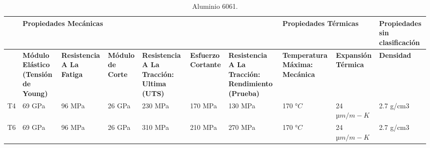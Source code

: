 \begin{landscape}
	\begin{table}[H]
		\centering
		\small
		\caption{Aluminio 6061.}
			\begin{tabular}{|p{1.5em}|p{5.355em}|p{5.355em}|p{5.355em}|p{5.355em}|p{4.645em}|p{7em}|p{6.285em}|p{5.8em}|p{5.93em}|}
			\hline
			\multicolumn{1}{|r|}{} & \multicolumn{6}{p{39.995em}|}{\cellcolor[rgb]{ .851,  .882,  .949}\textbf{Propiedades Mecánicas}} & \multicolumn{2}{p{13.64em}|}{\cellcolor[rgb]{ .988,  .894,  .839}\textbf{Propiedades Térmicas}} & \cellcolor[rgb]{ 1,  .949,  .8}\textbf{Propiedades sin clasificación} \\
			\hline
			\multicolumn{1}{|r|}{} & \cellcolor[rgb]{ .851,  .882,  .949}\textbf{Módulo Elástico (Tensión de Young)} & \cellcolor[rgb]{ .851,  .882,  .949}\textbf{Resistencia A La Fatiga} & \cellcolor[rgb]{ .851,  .882,  .949}\textbf{Módulo de Corte} & \cellcolor[rgb]{ .851,  .882,  .949}\textbf{Resistencia A La Tracción: Ultima (UTS)} & \cellcolor[rgb]{ .851,  .882,  .949}\textbf{Esfuerzo Cortante} & \cellcolor[rgb]{ .851,  .882,  .949}\textbf{Resistencia A La Tracción: Rendimiento (Prueba)} & \cellcolor[rgb]{ .988,  .894,  .839}\textbf{Temperatura Máxima: Mecánica} & \cellcolor[rgb]{ .988,  .894,  .839}\textbf{Expansión Térmica} & \cellcolor[rgb]{ 1,  .949,  .8}\textbf{Densidad} \\
			\hline
			T4    & 69 GPa & 96 MPa & 26 GPa & 230 MPa & 170 MPa & 130 MPa & 170 $°C$ & 24 $µm/m-K$ & 2.7 g/cm3 \\
			\hline
			T6    & 69 GPa & 96 MPa & 26 GPa & 310 MPa & 210 MPa & 270 MPa & 170 $°C$ & 24 $µm/m-K$ & 2.7 g/cm3 \\
			\hline
		\end{tabular}%
		\label{tab:Alu6061}%
		
	\end{table}%
\end{landscape}

